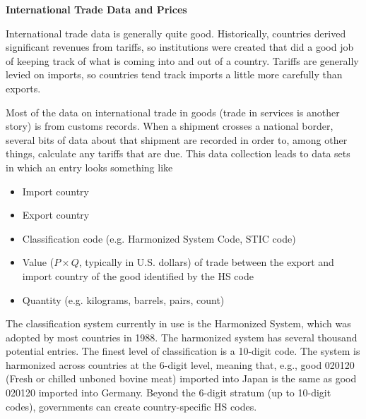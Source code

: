 \documentclass[11pt, pdftex]{article}
\newcommand{\ph}{\phantom}
\begin{document}
\ph{whatever}
\medskip

\centerline{\Large  \textbf{International Trade Data and Prices}}
\medskip

International trade data is generally quite good.  Historically, countries derived significant revenues from tariffs, so institutions were created that did a good job of keeping track of what is coming into and out of a country.  Tariffs are generally levied on imports, so countries tend track imports a little more carefully than exports.

 Most of the data on international trade in goods (trade in services is another story) is from customs records.  When a shipment crosses a national border, several bits of data about that shipment are recorded in order to, among other things, calculate any tariffs that are due. This data collection leads to data sets in which an entry  looks something like

\begin{itemize}
  \item Import country
  \item Export country
  \item Classification code (e.g. Harmonized System Code, STIC code)
  \item Value ($P \times Q$, typically in U.S. dollars) of trade between the export and import country of the good identified by the HS code
  \item Quantity (e.g. kilograms, barrels, pairs, count)
\end{itemize}

The classification system currently in use is the Harmonized System, which was adopted by most countries in 1988.  The harmonized system has several thousand potential entries.  The finest level of classification is a 10-digit code. The system is harmonized across countries at the 6-digit level, meaning that, e.g., good 020120 (Fresh or chilled unboned bovine meat) imported into Japan is the same as good 020120 imported into Germany. Beyond the 6-digit stratum (up to 10-digit codes), governments can create country-specific HS codes.
\end{document}
